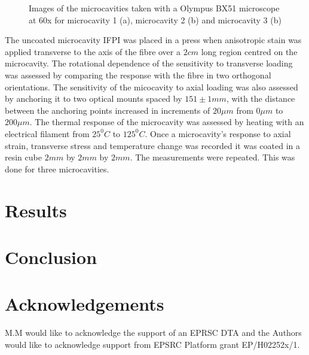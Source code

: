 \documentclass[]{spie}  %
\begin{document}
\begin{figure}[H]
\begin{subfigure}{0.3\linewidth}
	\caption{}
	\label{fig:Bub9Image}
	\end{subfigure}
\caption{Images of the microcavities taken with a Olympus BX51 microscope at 60x for microcavity 1 (a), microcavity 2 (b) and microcavity 3 (b)}
\label{fig:BubImages}	
\end{figure}
The uncoated microcavity IFPI was placed in a press when anisotropic stain was applied transverse to the axis of the fibre over a $2cm$ long region centred on the microcavity. The rotational dependence of the sensitivity to transverse loading was assessed by comparing the response with the fibre in two orthogonal orientations. The sensitivity of the micocavity to axial loading was also assessed by anchoring it to two optical mounts spaced by $151\pm 1mm$, with the distance between the anchoring points increased in increments of $20 \mu m$ from $0 \mu m$ to $200 \mu m$. The thermal response of the microcavity was assessed by heating with an electrical filament from $25^{0}C$ to $125^{0}C$. Once a microcavity's response to axial strain, transverse stress and temperature change was recorded it was coated in a resin cube $2mm$ by $2mm$ by $2mm$. The measurements were repeated. This was done for three microcavities.
\section{Results}

\section{Conclusion}


\section*{Acknowledgements}
M.M would like to acknowledge the support of an EPRSC DTA and the Authors would like to acknowledge support from EPSRC Platform grant EP/H02252x/1. 



\end{document}
